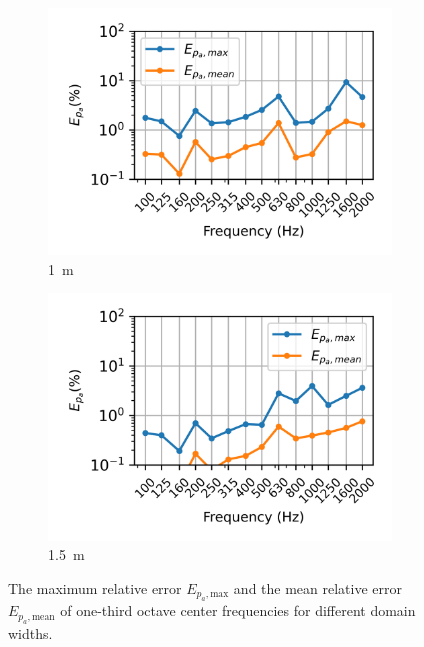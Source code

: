 \begin{figure}
	\begin{subfigure}[b]{0.48\textwidth}
		\centering
		\includegraphics{fig/chap4/simulation_domain/width_1m.png}
		\caption{\SI{1}{\meter}}
	\end{subfigure}
	\hfill
	\begin{subfigure}[b]{0.48\textwidth}
		\centering
		\includegraphics{fig/chap4/simulation_domain/width_1pt5m.png}
		\caption{\SI{1.5}{\meter}}
	\end{subfigure}
	\caption{The maximum relative error $E_{p_a,\text{max}}$ and the mean relative error $E_{p_a,\text{mean}}$ of one-third octave center frequencies for different domain widths.}
	\label{fig:relative_error_spectrum}
\end{figure}

